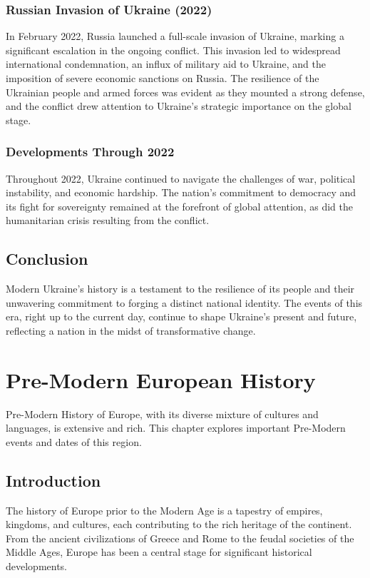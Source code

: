 \documentclass[a4paper,12pt]{book}
\begin{document}
\subsection{Russian Invasion of Ukraine (2022)}
In February 2022, Russia launched a full-scale invasion of Ukraine, marking a significant escalation in the ongoing conflict. This invasion led to widespread international condemnation, an influx of military aid to Ukraine, and the imposition of severe economic sanctions on Russia. The resilience of the Ukrainian people and armed forces was evident as they mounted a strong defense, and the conflict drew attention to Ukraine's strategic importance on the global stage.

\subsection{Developments Through 2022}
Throughout 2022, Ukraine continued to navigate the challenges of war, political instability, and economic hardship. The nation’s commitment to democracy and its fight for sovereignty remained at the forefront of global attention, as did the humanitarian crisis resulting from the conflict.

\section{Conclusion}
\label{sec:conclusion-modern-ukraine}
Modern Ukraine’s history is a testament to the resilience of its people and their unwavering commitment to forging a distinct national identity. The events of this era, right up to the current day, continue to shape Ukraine's present and future, reflecting a nation in the midst of transformative change.

\chapter{Pre-Modern European History}
\label{ch:pre-modern-european-history}

Pre-Modern History of Europe, with its diverse mixture of cultures and languages, is extensive and rich. This chapter explores important Pre-Modern events and dates of this region.

\section{Introduction}
\label{sec:introduction-pre-modern-europe}
The history of Europe prior to the Modern Age is a tapestry of empires, kingdoms, and cultures, each contributing to the rich heritage of the continent. From the ancient civilizations of Greece and Rome to the feudal societies of the Middle Ages, Europe has been a central stage for significant historical developments.
\end{document}
